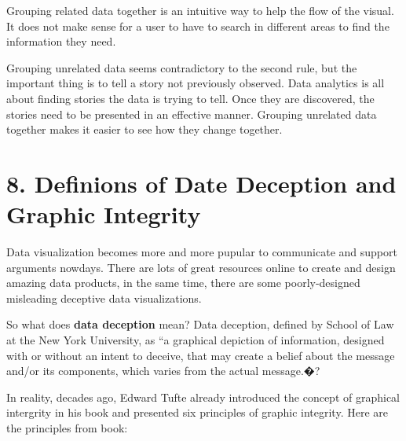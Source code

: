 \documentclass[]{book}
\theoremstyle{definition}
\theoremstyle{definition}
\theoremstyle{definition}
\theoremstyle{remark}
\begin{document}
Grouping related data together is an intuitive way to help the flow of
the visual. It does not make sense for a user to have to search in
different areas to find the information they need.

Grouping unrelated data seems contradictory to the second rule, but the
important thing is to tell a story not previously observed. Data
analytics is all about finding stories the data is trying to tell. Once
they are discovered, the stories need to be presented in an effective
manner. Grouping unrelated data together makes it easier to see how they
change together.

\section{8. Definions of Date Deception and Graphic
Integrity}\label{definions-of-date-deception-and-graphic-integrity-1}

Data visualization becomes more and more pupular to communicate and
support arguments nowdays. There are lots of great resources online to
create and design amazing data products, in the same time, there are
some poorly-designed misleading deceptive data visualizations.

So what does \textbf{data deception} mean? Data deception, defined by
School of Law at the New York University, as ``a graphical depiction of
information, designed with or without an intent to deceive, that may
create a belief about the message and/or its components, which varies
from the actual message.�?

In reality, decades ago, Edward Tufte already introduced the concept of
graphical intergrity in his book and presented six principles of graphic
integrity. Here are the principles from book:
\end{document}
